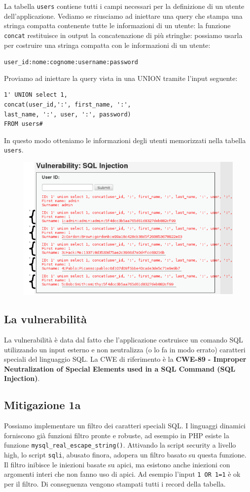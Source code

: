 La tabella \texttt{users} contiene tutti i campi necessari per la definizione di un utente dell'applicazione. Vediamo se riusciamo ad iniettare una query che stampa una stringa compatta contenente tutte le informazioni di un utente: la funzione \texttt{concat} restituisce in output la concatenazione di più stringhe: possiamo usarla per costruire una stringa compatta con le informazioni di un utente: 
\begin{center}
    \texttt{user\_id:nome:cognome:username:password}
\end{center}
Proviamo ad iniettare la query vista in una UNION tramite l'input seguente:
\begin{lstlisting}
1' UNION select 1,
concat(user_id,':', first_name, ':',
last_name, ':', user, ':', password)
FROM users#
\end{lstlisting}
In questo modo otteniamo le informazioni degli utenti memorizzati nella tabella \texttt{users}.

\begin{figure}[hbpt!]
    \centering
    \includegraphics[width=0.6 \textwidth]{./Images/cap6/6.5.png}
\end{figure}
\FloatBarrier

\subsection{La vulnerabilità}
La vulnerabilità è data dal fatto che l'applicazione costruisce un comando SQL utilizzando un input esterno e non neutralizza (o lo fa in modo errato) caratteri speciali del linguaggio SQL. La CWE di riferimento è la \textbf{CWE-89 - Improper Neutralization of Special Elements used in a SQL Command (SQL Injection)}.

\subsection{Mitigazione 1a}
Possiamo implementare un filtro dei caratteri speciali SQL. I linguaggi dinamici forniscono già funzioni filtro pronte e robuste, ad esempio in PHP esiste la funzione \texttt{mysql\_real\_escape\_string()}. Attivando la script security a livello high, lo script \texttt{sqli}, abusato finora, adopera un filtro basato su questa funzione. Il filtro inibisce le iniezioni basate su apici, ma esistono anche iniezioni con argomenti interi che non fanno uso di apici. Ad esempio l'input \texttt{1 OR 1=1} è ok per il filtro. Di conseguenza vengono stampati tutti i record della tabella.

